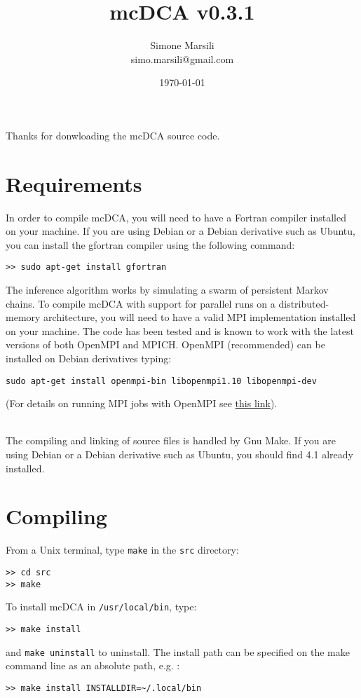 \documentclass[a4paper,onecolumn]{article}
\title{mcDCA v0.3.1}
\author{
        Simone Marsili \\
        simo.marsili@gmail.com
}
\date{\today}
\begin{document}
\maketitle

Thanks for donwloading the mcDCA source code.

\section{Requirements}
\label{sec:requirements}

In order to compile mcDCA, you will need to have a Fortran compiler installed on your machine.   
If you are using Debian or a Debian derivative such as Ubuntu, you can install the gfortran compiler using the following command:
\begin{verbatim}
>> sudo apt-get install gfortran
\end{verbatim}

The inference algorithm works by simulating a swarm of persistent Markov chains. 
To compile mcDCA with support for parallel runs on a distributed-memory architecture,
you will need to have a valid MPI implementation installed on your machine. 
The code has been tested and is known to work with the latest versions of both OpenMPI and MPICH.   
OpenMPI (recommended) can be installed on Debian derivatives typing:
\begin{verbatim}
sudo apt-get install openmpi-bin libopenmpi1.10 libopenmpi-dev
\end{verbatim}
(For details on running MPI jobs with OpenMPI see \href{https://www.open-mpi.org/faq/?category=running}{this link}).
\\\

The compiling and linking of source files is handled by Gnu Make. 
If you are using Debian or a Debian derivative such as Ubuntu, you should find 4.1 already installed.

\section{Compiling}
\label{sec:compiling}
From a Unix terminal, type \verb|make| in the \verb|src| directory:
\begin{verbatim}
>> cd src
>> make
\end{verbatim}
To install mcDCA in \verb|/usr/local/bin|, type:
\begin{verbatim}
>> make install
\end{verbatim}
and \verb|make uninstall| to uninstall.
The install path can be specified on the make command line as an absolute path,
e.g. :
\begin{verbatim}
>> make install INSTALLDIR=~/.local/bin
\end{verbatim}
\end{document}
